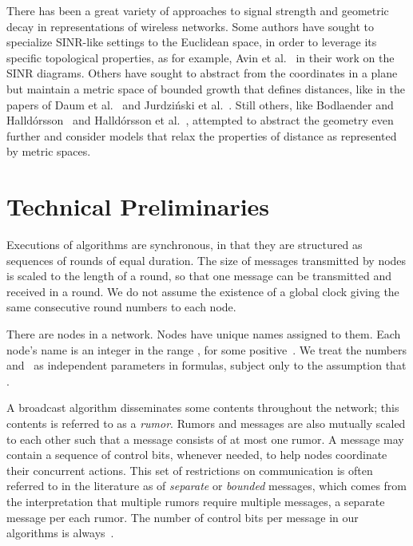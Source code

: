 \documentclass[11pt]{article}
\begin{document}
There has been a great variety of approaches to signal strength and geometric decay in representations of wireless networks.
Some authors have sought to specialize SINR-like settings to the Euclidean space, in order to leverage its specific topological properties, as for example,  Avin et al.~\cite{AvinEKLPR12} in their work on the SINR diagrams.
Others have sought to abstract from the coordinates in a plane but maintain a metric space of bounded growth that defines distances, like in the papers of Daum et al.~\cite{DGKN13} and Jurdzi\'nski et al.~\cite{JurdzinskiKRS-PODC14}.
Still others, like Bodlaender and Halld{\'o}rsson~\cite{BodlaenderH13} and Halld{\'o}rsson et al.~\cite{HalldorssonTWY16}, attempted to abstract the geometry even further and consider models that relax the properties of distance as represented by metric spaces.



\section{Technical Preliminaries}

\label{sec:technical-preliminaries}



Executions of algorithms are synchronous, in that they are structured as sequences of rounds of equal duration.
The size of messages transmitted by nodes is scaled to the length of a round, so that one message can be transmitted and received in a round.
We do not assume the existence of a global clock giving the same consecutive round numbers to each node. 


There are  nodes in a network.
Nodes have unique names assigned to them.
Each node's name is an integer in the range , for some positive~.
We treat the numbers  and~ as independent parameters in formulas, subject only to the assumption that .

A broadcast algorithm disseminates some contents throughout the network; this contents is referred to as a \emph{rumor}.
Rumors and messages are also mutually scaled to each other such that a message  consists of at most one rumor.
A message may contain a sequence of control bits, whenever needed, to help nodes coordinate their concurrent actions.
This set of restrictions on communication is often referred to in the literature as of \emph{separate} or \emph{bounded} messages, which comes from the interpretation that multiple rumors require multiple  messages, a separate message per each rumor. 
The number of control bits per message in our algorithms is always~.
\end{document}
